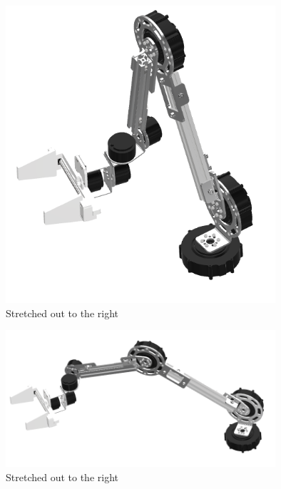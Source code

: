 \begin{figure}[h]
  \centering
  \includegraphics[width=10cm]{images/design/migitika.png}
  \caption{Stretched out to the right}
  \label{fig:move1}
\end{figure}

\begin{figure}[h]
  \centering
  \includegraphics[width=10cm]{images/design/migioku.png}
  \caption{Stretched out to the right}
  \label{fig:move2}
\end{figure}

